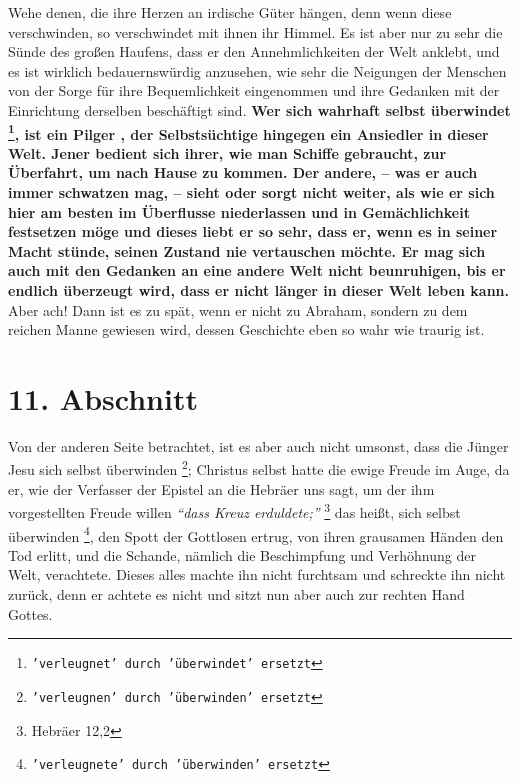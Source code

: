\label{ref:04_10_pilger}
 Wehe denen, die ihre Herzen an irdische Güter hängen, denn
wenn diese
verschwinden, so verschwindet mit ihnen ihr Himmel.  Es ist
aber nur zu sehr die
Sünde des großen Haufens, dass er den Annehmlichkeiten der Welt anklebt, und es
ist wirklich bedauernswürdig anzusehen, wie sehr die Neigungen der Menschen von
der Sorge für ihre Bequemlichkeit eingenommen und ihre Gedanken mit der
Einrichtung derselben beschäftigt sind. \textbf{Wer sich wahrhaft selbst
überwindet \footnote{\texttt{'verleugnet' durch 'überwindet' ersetzt}}, ist
ein Pilger , der Selbstsüchtige hingegen ein Ansiedler in dieser
Welt. Jener
bedient sich ihrer, wie man Schiffe gebraucht, zur Überfahrt, um nach Hause zu
kommen. Der andere, -- was er auch immer schwatzen mag, -- sieht oder sorgt
nicht weiter, als wie er sich hier am besten im Überflusse niederlassen und in
Gemächlichkeit festsetzen möge und dieses liebt er so sehr, dass er, wenn es in
seiner Macht stünde, seinen Zustand nie vertauschen möchte. Er mag sich auch mit
den Gedanken an eine andere Welt nicht beunruhigen, bis er endlich überzeugt
wird, dass er nicht länger in dieser Welt leben kann.} Aber ach! Dann ist es zu
spät, wenn er nicht zu Abraham, sondern zu dem reichen Manne gewiesen wird,
dessen Geschichte eben so wahr wie traurig ist.

\section{11. Abschnitt} \label{kap4_ab11}


Von der anderen Seite betrachtet, ist es aber auch nicht umsonst, dass die Jünger
Jesu sich selbst überwinden \footnote{\texttt{'verleugnen' durch 'überwinden'
ersetzt}}; Christus selbst hatte die ewige Freude im Auge, da er,
wie der Verfasser der Epistel an die Hebräer uns sagt, um der ihm vorgestellten
Freude willen
\textit{"`dass Kreuz erduldete;"'}
\footnote{Hebräer 12,2}
das heißt, sich
selbst überwinden \footnote{\texttt{'verleugnete' durch 'überwinden' ersetzt}}, den
Spott der Gottlosen ertrug, von ihren grausamen Händen
den Tod erlitt, und die Schande, nämlich die Beschimpfung und Verhöhnung der
Welt, verachtete. Dieses alles machte ihn nicht furchtsam und schreckte ihn
nicht zurück, denn er achtete es nicht und sitzt nun aber auch zur rechten Hand
Gottes.

\medskip

